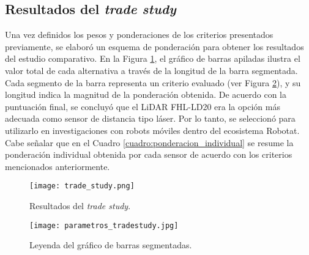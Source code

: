 \subsection{Resultados del \textit{trade study}}
Una vez definidos los pesos y ponderaciones de los criterios presentados previamente, se elaboró un esquema de ponderación para obtener los resultados del estudio comparativo. En la Figura \ref{fig:graf_trade_study}, el gráfico de barras apiladas ilustra el valor total de cada alternativa a través de la longitud de la barra segmentada. Cada segmento de la barra representa un criterio evaluado (ver Figura \ref{fig:legend_graf_trade_study}), y su longitud indica la magnitud de la ponderación obtenida. De acuerdo con la puntuación final, se concluyó que el LiDAR FHL-LD20 era la opción más adecuada como sensor de distancia tipo láser. Por lo tanto, se seleccionó para utilizarlo en investigaciones con robots móviles dentro del ecosistema Robotat. Cabe señalar que en el Cuadro \ref{cuadro:ponderacion_individual} se resume la ponderación individual obtenida por cada sensor de acuerdo con los criterios mencionados anteriormente.

\begin{figure}[H]
	\centering
	\texttt{[image: trade\_study.png]}
	\caption{Resultados del \textit{trade study}.}
	\label{fig:graf_trade_study}
\end{figure}

\begin{figure}[H]
	\centering
	\texttt{[image: parametros\_tradestudy.jpg]}
	\caption{Leyenda del gráfico de barras segmentadas.}
	\label{fig:legend_graf_trade_study}
\end{figure}

